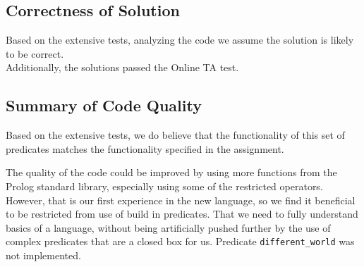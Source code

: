\documentclass[11pt, a4paper]{article}
\begin{document}
\subsection{Correctness of Solution}
Based on the extensive tests, analyzing the code we assume the solution is likely to be correct.
\\
Additionally, the solutions passed the Online TA test.

\subsection{Summary of Code Quality}
Based on the extensive tests, we do believe that the functionality of this set of predicates matches the functionality specified in the assignment. 

The quality of the code could be improved by using more functions from the Prolog standard library, especially using some of the restricted operators.  However, that is our first experience in the new language, so we find it beneficial to be restricted from use of build in predicates. That we need to fully understand basics of a language, without being artificially pushed further by the use of complex predicates that are a closed box for us.  Predicate \texttt{different\_world} was not implemented.
\end{document}
